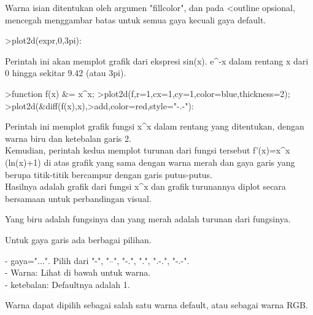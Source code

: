 \documentclass{article}
\begin{document}
\begin{eulernotebook}
\begin{eulercomment}
\begin{eulercomment}
\begin{eulercomment}
\begin{eulercomment}
\begin{eulercomment}
\begin{eulercomment}
\begin{eulercomment}
Warna isian ditentukan oleh argumen "fillcolor", dan pada \textless{}outline
opsional, mencegah menggambar batas untuk semua gaya kecuali gaya
default.
\end{eulercomment}
\begin{eulerprompt}
>plot2d(expr,0,3pi):
\end{eulerprompt}
\begin{eulercomment}
Perintah ini akan memplot grafik dari ekspresi sin(x). e\textasciicircum{}-x dalam
rentang x dari 0 hingga sekitar 9.42 (atau 3pi).
\end{eulercomment}
\begin{eulerprompt}
>function f(x) &= x^x;
>plot2d(f,r=1,cx=1,cy=1,color=blue,thickness=2);
>plot2d(&diff(f(x),x),>add,color=red,style="-.-"):
\end{eulerprompt}
\begin{eulercomment}
Perintah ini memplot grafik fungsi x\textasciicircum{}x dalam rentang yang ditentukan,
dengan warna biru dan ketebalan garis 2.\\
Kemudian, perintah kedua memplot turunan dari fungsi tersebut
f'(x)=x\textasciicircum{}x (ln(x)+1) di atas grafik yang sama dengan warna merah dan
gaya garis yang berupa titik-titik bercampur dengan garis putus-putus.\\
Hasilnya adalah grafik dari fungsi x\textasciicircum{}x dan grafik turunannya diplot
secara bersamaan untuk perbandingan visual.

Yang biru adalah fungsinya dan yang merah adalah turunan dari
fungsinya.

Untuk gaya garis ada berbagai pilihan.

- gaya="...". Pilih dari "-", "--", "-.", ".", ".-.", "-.-".\\
- Warna: Lihat di bawah untuk warna.\\
- ketebalan: Defaultnya adalah 1.

Warna dapat dipilih sebagai salah satu warna default, atau sebagai
warna RGB.


\end{eulercomment}
\end{eulercomment}
\end{eulercomment}
\end{eulercomment}
\end{eulercomment}
\end{eulercomment}
\end{eulercomment}
\end{eulernotebook}
\end{document}
